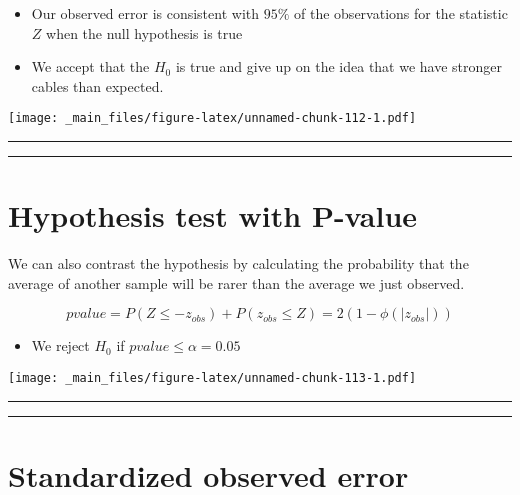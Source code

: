 \documentclass[
]{book}
\providecommand{\tightlist}{%
  \setlength{\itemsep}{0pt}\setlength{\parskip}{0pt}}
\begin{document}
\begin{itemize}
\item
  Our observed error is consistent with \(95\%\) of the observations for the statistic \(Z\) when the null hypothesis is true
\item
  We accept that the \(H_0\) is true and give up on the idea that we have stronger cables than expected.
\end{itemize}

\texttt{[image: \_main\_files/figure-latex/unnamed-chunk-112-1.pdf]}

\begin{center}\rule{0.5\linewidth}{0.5pt}\end{center}

\begin{center}\rule{0.5\linewidth}{0.5pt}\end{center}

\hypertarget{hypothesis-test-with-p-value}{%
\section{Hypothesis test with P-value}\label{hypothesis-test-with-p-value}}

We can also contrast the hypothesis by calculating the probability that the average of another sample will be rarer than the average we just observed.

\[pvalue = P(Z \leq -z_{obs}) + P(z_{obs} \leq Z) = 2 (1-\phi(|z_{obs}|))\]

\begin{itemize}
\tightlist
\item
  We reject \(H_0\) if \(pvalue \leq \alpha =0.05\)
\end{itemize}

\texttt{[image: \_main\_files/figure-latex/unnamed-chunk-113-1.pdf]}

\begin{center}\rule{0.5\linewidth}{0.5pt}\end{center}

\begin{center}\rule{0.5\linewidth}{0.5pt}\end{center}

\hypertarget{standardized-observed-error-1}{%
\section{Standardized observed error}\label{standardized-observed-error-1}}
\end{document}
